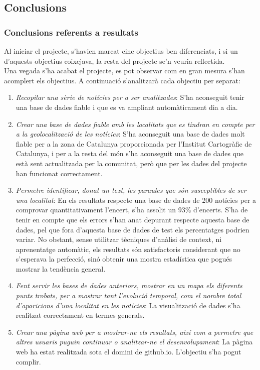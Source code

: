 \documentclass[12pt,a4paper,openright,oneside]{article}
\numberwithin{equation}{section}
\theoremstyle{definition}
\begin{document}
\subsection{Conclusions}
\subsubsection*{Conclusions referents a resultats}
Al iniciar el projecte, s'havien marcat cinc objectius ben diferenciats, i si un d'aquests objectius coixejava, la resta del projecte se'n veuria reflectida.\\
Una vegada s'ha acabat el projecte, es pot observar com en gran mesura s'han acomplert els objectius. A continuació s'analitzarà cada objectiu per separat:
\begin{enumerate}
\item \emph{Recopilar una sèrie de notícies per a ser analitzades}: S'ha aconseguit tenir una base de dades fiable i que es va ampliant automàticament dia a dia.
\item \emph{Crear una base de dades fiable amb les localitats que es tindran en compte per a la geolocalització de les notícies}: S'ha aconseguit una base de dades molt fiable per a la zona de Catalunya proporcionada per l'Institut Cartogràfic de Catalunya, i per a la resta del món s'ha aconseguit una base de dades que està sent actualitzada per la comunitat, però que per les dades del projecte han funcionat correctament.
\item \emph{Permetre identificar, donat un text, les paraules que són susceptibles de ser una localitat}: En els resultats respecte una base de dades de 200 notícies per a comprovar quantitativament l'encert, s'ha assolit un 93\% d'encerts. S'ha de tenir en compte que els errors s'han anat depurant respecte aquesta base de dades, pel que fora d'aquesta base de dades de test els percentatges podrien variar. No obstant, sense utilitzar tècniques d'anàlisi de context, ni aprenentatge automàtic, els resultats són satisfactoris considerant que no s'esperava la perfecció, sinó obtenir una mostra estadística que pogués mostrar la tendència general.
\item \emph{Fent servir les bases de dades anteriors, mostrar en un mapa els diferents punts trobats, per a mostrar tant l'evolució temporal, com el nombre total d'aparicions d'una localitat en les notícies}: La visualització de dades s'ha realitzat correctament en termes generals.
\item \emph{Crear una pàgina web per a mostrar-ne els resultats, així com a permetre que altres usuaris puguin continuar o analitzar-ne el desenvolupament}: La pàgina web ha estat realitzada sota el domini de github.io. L'objectiu s'ha pogut complir.
\end{enumerate}
\end{document}

